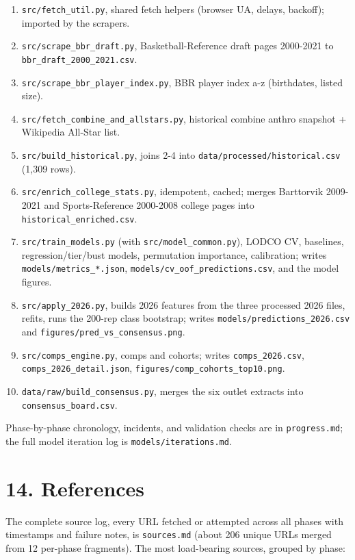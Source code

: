 \documentclass[
  10pt,
]{article}
\providecommand{\tightlist}{%
  \setlength{\itemsep}{0pt}\setlength{\parskip}{0pt}}
\begin{document}
\begin{enumerate}
\def\labelenumi{\arabic{enumi}.}
\tightlist
\item
  \texttt{src/fetch\_util.py}, shared fetch helpers (browser UA, delays,
  backoff); imported by the scrapers.
\item
  \texttt{src/scrape\_bbr\_draft.py}, Basketball-Reference draft pages 2000-2021
  to \texttt{bbr\_draft\_2000\_2021.csv}.
\item
  \texttt{src/scrape\_bbr\_player\_index.py}, BBR player index a-z (birthdates,
  listed size).
\item
  \texttt{src/fetch\_combine\_and\_allstars.py}, historical combine anthro
  snapshot + Wikipedia All-Star list.
\item
  \texttt{src/build\_historical.py}, joins 2-4 into
  \texttt{data/processed/historical.csv} (1,309 rows).
\item
  \texttt{src/enrich\_college\_stats.py}, idempotent, cached; merges Barttorvik
  2009-2021 and Sports-Reference 2000-2008 college pages into
  \texttt{historical\_enriched.csv}.
\item
  \texttt{src/train\_models.py} (with \texttt{src/model\_common.py}), LODCO CV,
  baselines, regression/tier/bust models, permutation importance, calibration;
  writes \texttt{models/metrics\_*.json},
  \texttt{models/cv\_oof\_predictions.csv}, and the model figures.
\item
  \texttt{src/apply\_2026.py}, builds 2026 features from the three processed
  2026 files, refits, runs the 200-rep class bootstrap; writes
  \texttt{models/predictions\_2026.csv} and
  \texttt{figures/pred\_vs\_consensus.png}.
\item
  \texttt{src/comps\_engine.py}, comps and cohorts; writes
  \texttt{comps\_2026.csv}, \texttt{comps\_2026\_detail.json},
  \texttt{figures/comp\_cohorts\_top10.png}.
\item
  \texttt{data/raw/build\_consensus.py}, merges the six outlet extracts into
  \texttt{consensus\_board.csv}.
\end{enumerate}

Phase-by-phase chronology, incidents, and validation checks are in
\texttt{progress.md}; the full model iteration log is
\texttt{models/iterations.md}.

\section{14. References}\label{references}

The complete source log, every URL fetched or attempted across all phases with
timestamps and failure notes, is \texttt{sources.md} (about 206 unique URLs
merged from 12 per-phase fragments). The most load-bearing sources, grouped by
phase:
\end{document}
